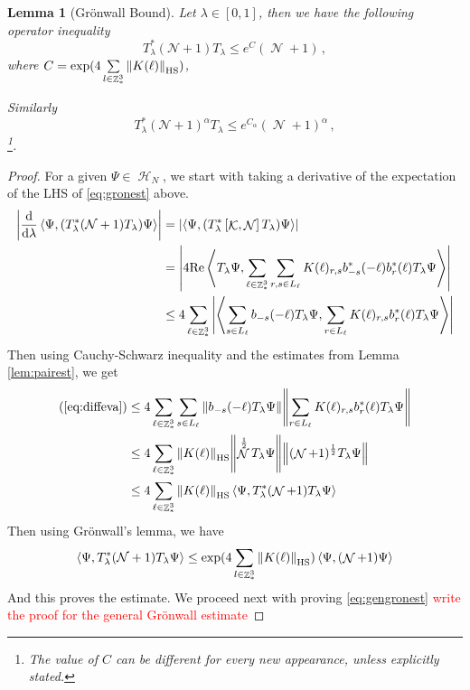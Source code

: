 \documentclass[sn-mathphys, Numbered ,a4paper]{sn-jnl}%
\DeclareMathOperator{\Z}{\mathbb{Z}}
\DeclareMathOperator{\HH}{\mathcal{H}}
\DeclareMathOperator{\KK}{\mathcal{K}}
\DeclareMathOperator{\NN}{\mathcal{N}}
\newcommand{\half}{\frac{1}{2}}
\newcommand{\eva}[1]{\left\langle #1 \right\rangle}
\newcommand{\di}{\mathrm{d}}
\theoremstyle{plain}
\newtheorem{lemma}[theorem]{Lemma}
\theoremstyle{definition}
\theoremstyle{remark}
\theoremstyle{plain}
\theoremstyle{definition}
\theoremstyle{remark}
\begin{document}
\begin{lemma}[Gr\"onwall Bound]\label{lem:gronNest}
    Let $\lambda\in [0,1]$, then we have the following operator inequality
    \begin{equation}\label{eq:gronest}
     T^*_{\lambda}(\mathcal{N} +1)T_{\lambda} \leq e^C (\NN+1)\, ,    
    \end{equation}
     where $C = \mathrm{exp}(4\sum\limits_{l\in \Z^3_*}\norm{K(\ell)}_{\mathrm{HS}})$,
     
     Similarly
     \begin{equation}\label{eq:gengronest}
     	T^*_{\lambda}(\mathcal{N} +1)^{\alpha}T_{\lambda} \leq e^{C_\alpha} (\NN+1)^{\alpha}\, , 
     \end{equation}
     \footnote{The value of $C$ can be different for every new appearance, unless explicitly stated.}.
\end{lemma}
\begin{proof}
    For a given $\Psi \in \HH_N$, we start with taking a derivative of the expectation of the LHS of \eqref{eq:gronest} above.
    \begin{align}
        \left|\frac{\di}{\di\lambda}\eva{\Psi, (T^*_{\lambda}(\mathcal{N} +1)T_{\lambda})\Psi }\right| 
        &= \left|\eva{\Psi,(T^*_{\lambda}\left[\KK,\NN\right]T_{\lambda}) \Psi}\right|\nonumber\\
        &= \abs{4\mathrm{Re} \eva{T_\lambda\Psi,\sum\limits_{\ell \in \Z^3_*}\sum\limits_{r,s \in L_{\ell}}K(\ell)_{r,s} b^*_{-s}(-\ell)b^*_{r}(\ell)T_\lambda\Psi}}\nonumber\\
        &\leq 4 \sum\limits_{\ell \in \Z^3_*} \abs{\eva{\sum\limits_{s \in L_{\ell}}b_{-s}(-\ell) T_\lambda\Psi,\sum\limits_{r \in L_{\ell}}K(\ell)_{r,s} b^*_{r}(\ell)T_\lambda\Psi}}\label{eq:diffeva}
    \end{align}
    Then using Cauchy-Schwarz inequality and the estimates from Lemma \ref{lem:pairest}, we get
    \begin{align}
        (\ref{eq:diffeva}) &\leq 4\sum\limits_{\ell \in \Z^3_*}\sum\limits_{s \in L_{\ell}} \norm{b_{-s}(-\ell) T_\lambda\Psi} \norm{\sum\limits_{r \in L_{\ell}}K(\ell)_{r,s} b^*_{r}(\ell)T_\lambda\Psi} \nonumber\\
        &\leq 4 \sum\limits_{\ell \in \Z^3_*} \norm{K(\ell)}_{\mathrm{HS}}\norm{\NN^\half T_\lambda\Psi}\norm{(\NN+1)^\half T_\lambda\Psi}\nonumber\\
        &\leq 4 \sum\limits_{\ell \in \Z^3_*} \norm{K(\ell)}_{\mathrm{HS}} \eva{\Psi,T^*_\lambda(\NN+1)T_\lambda\Psi}
    \end{align}
    Then using Gr\"onwall's lemma, we have
    \begin{equation}
        \eva{\Psi, T^*_{\lambda}(\mathcal{N} +1)T_{\lambda} \Psi } \leq \mathrm{exp}(4\sum\limits_{l\in \Z^3_*} \norm{K(\ell)}_{\mathrm{HS}}) \eva{\Psi, (\NN+1)\Psi}
    \end{equation}
    And this proves the estimate.
    We proceed next with proving \eqref{eq:gengronest}
    \textcolor{red}{write the proof for the general Gr\"onwall estimate}
\end{proof}
\end{document}

